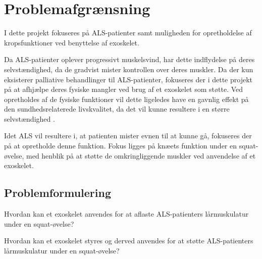 \section{Problemafgrænsning}
I dette projekt fokuseres på ALS-patienter samt muligheden for opretholdelse af kropsfunktioner ved benyttelse af exoskelet. 

Da ALS-patienter oplever progressivt muskelsvind, har dette indflydelse på deres selvstændighed, da de gradvist mister kontrollen over deres muskler. Da der kun eksisterer palliative behandlinger til ALS-patienter, fokuseres der i dette projekt på at afhjælpe deres fysiske mangler ved brug af et exoskelet som støtte.
Ved opretholdes af de fysiske funktioner vil dette ligeledes have en gavnlig effekt på den sundhedsrelaterede livskvalitet, da det vil kunne resultere i en større selvstændighed \citep{ilse2015, tramonti2012}.%

Idet ALS vil resultere i, at patienten mister evnen til at kunne gå, fokuseres der på at opretholde denne funktion. Fokus ligges på knæets funktion under en squat-øvelse, med henblik på at støtte de omkringliggende muskler ved anvendelse af et exoskelet.

\subsection{Problemformulering}
Hvordan kan et exoskelet anvendes for at aflaste ALS-patienters lårmuskulatur under en squat-øvelse?

Hvordan kan et exoskelet styres og derved anvendes for at støtte ALS-patienters lårmuskulatur under en squat-øvelse?
